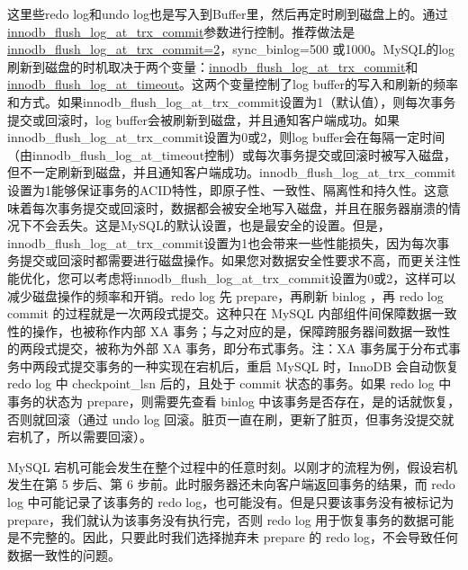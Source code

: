 \documentclass[../../../interview-questions.tex]{subfiles}
\begin{document}
这里些redo log和undo log也是写入到Buffer里，然后再定时刷到磁盘上的。通过\url{innodb\_flush\_log\_at\_trx\_commit}参数进行控制。推荐做法是\url{innodb\_flush\_log\_at\_trx\_commit=2}，sync\_binlog=500 或1000。MySQL的log刷新到磁盘的时机取决于两个变量：\url{innodb\_flush\_log\_at\_trx\_commit}和\url{innodb\_flush\_log\_at\_timeout}。这两个变量控制了log buffer的写入和刷新的频率和方式。如果innodb\_flush\_log\_at\_trx\_commit设置为1（默认值），则每次事务提交或回滚时，log buffer会被刷新到磁盘，并且通知客户端成功。如果innodb\_flush\_log\_at\_trx\_commit设置为0或2，则log buffer会在每隔一定时间（由innodb\_flush\_log\_at\_timeout控制）或每次事务提交或回滚时被写入磁盘，但不一定刷新到磁盘，并且通知客户端成功。innodb\_flush\_log\_at\_trx\_commit设置为1能够保证事务的ACID特性，即原子性、一致性、隔离性和持久性。这意味着每次事务提交或回滚时，数据都会被安全地写入磁盘，并且在服务器崩溃的情况下不会丢失。这是MySQL的默认设置，也是最安全的设置。但是，innodb\_flush\_log\_at\_trx\_commit设置为1也会带来一些性能损失，因为每次事务提交或回滚时都需要进行磁盘操作。如果您对数据安全性要求不高，而更关注性能优化，您可以考虑将innodb\_flush\_log\_at\_trx\_commit设置为0或2，这样可以减少磁盘操作的频率和开销。redo log 先 prepare，再刷新 binlog ，再 redo log commit 的过程就是一次两段式提交。这种只在 MySQL 内部组件间保障数据一致性的操作，也被称作内部 XA 事务；与之对应的是，保障跨服务器间数据一致性的两段式提交，被称为外部 XA 事务，即分布式事务。注：XA 事务属于分布式事务中两段式提交事务的一种实现在宕机后，重启 MySQL 时，InnoDB 会自动恢复 redo log 中 checkpoint\_lsn 后的，且处于 commit 状态的事务。如果 redo log 中事务的状态为 prepare，则需要先查看 binlog 中该事务是否存在，是的话就恢复，否则就回滚（通过 undo log 回滚。脏页一直在刷，更新了脏页，但事务没提交就宕机了，所以需要回滚）。

MySQL 宕机可能会发生在整个过程中的任意时刻。以刚才的流程为例，假设宕机发生在第 5 步后、第 6 步前。此时服务器还未向客户端返回事务的结果，而 redo log 中可能记录了该事务的 redo log，也可能没有。但是只要该事务没有被标记为 prepare，我们就认为该事务没有执行完，否则 redo log 用于恢复事务的数据可能是不完整的。因此，只要此时我们选择抛弃未 prepare 的 redo log，不会导致任何数据一致性的问题。
\end{document}
